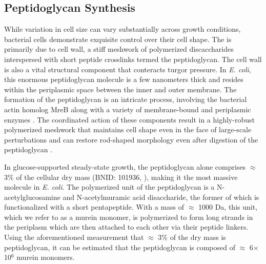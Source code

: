 \subsection{Peptidoglycan Synthesis}
While variation in cell size can vary substantially across growth conditions,
bacterial cells demonstrate exquisite control over their cell shape. The is
primarily due to cell wall, a stiff meshwork of polymerized discaccharides
interspersed with short peptide crosslinks termed the peptidoglycan. The cell
wall is also a vital structural component that conteracts turgor pressure. In
\textit{E. coli}, this enormous peptidoglycan molecule is a few nanometers thick
and resides within the periplasmic space between the inner and outer membrane.
The formation of the peptidoglycan is an intricate process, involving the
bacterial actin homolog MreB \citep{shi2018} along with a variety of
membrane-bound and periplasmic enzymes \citep{morgenstein2015}. The coordinated
action of these components result in a highly-robust polymerized meshwork that
maintains cell shape even in the face of large-scale perturbations and can
restore rod-shaped morphology even after digestion of the peptidoglycan
\citep{harris2018,shi2018}.

In glucose-supported steady-state growth, the peptidoglycan alone comprises
$\approx$ 3\% of the cellular dry mass (BNID: 101936, \cite{milo2010}), making
it the most massive molecule in \textit{E. coli}. The polymerized unit of the
peptidoglycan is a N-acetylglucosamine and N-acetylmuramic acid disaccharide,
the former of which is functionalized with a short pentapeptide. With a mass of
$\approx$ 1000 Da, this unit, which we refer to as a murein monomer, is
polymerized to form long strands in the periplasm which are then attached to
each other via their peptide linkers. Using the aforementioned measurement that
$\approx$ 3\% of the dry mass is peptidoglycan, it can be estimated that the
peptidoglycan is composed of $\approx$ 6$\times$10$^6$ murein monomers.

